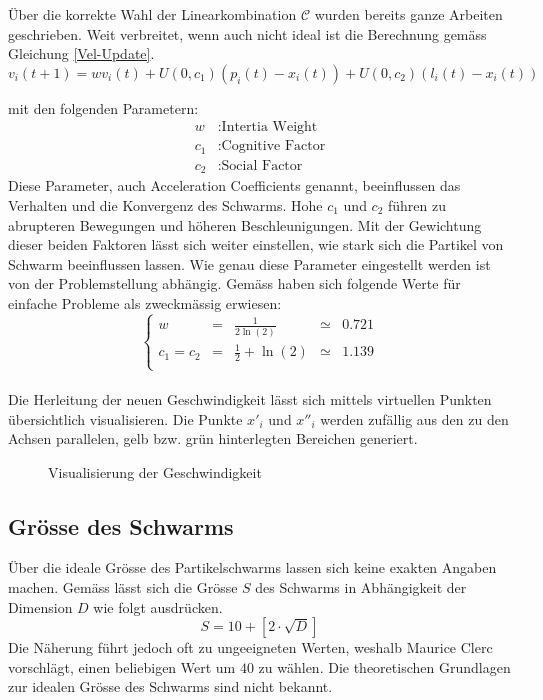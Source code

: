 Über die korrekte Wahl der Linearkombination $\mathcal{C}$ wurden bereits ganze Arbeiten geschrieben. Weit verbreitet, wenn auch nicht ideal ist die Berechnung gemäss Gleichung \ref{Vel-Update}. \\
\begin{equation}
	v_i(t+1) = w v_i(t) + U(0,c_1) (p_i(t)-x_i(t)) + U(0,c_2) (l_i(t)-x_i(t))\label{Vel-Update}
\end{equation}

mit den folgenden Parametern:
\begin{align*}
	w &: \text{Intertia Weight} \\
	c_1 &: \text{Cognitive Factor} \\
	c_2 &: \text{Social Factor}
\end{align*}
Diese Parameter, auch Acceleration Coefficients genannt, beeinflussen das  Verhalten und die Konvergenz des Schwarms. Hohe $c_1$ und $c_2$ führen zu abrupteren Bewegungen und höheren Beschleunigungen. Mit der Gewichtung dieser beiden Faktoren lässt sich weiter einstellen, wie stark sich die Partikel von Schwarm beeinflussen lassen. Wie genau diese Parameter eingestellt werden ist von der Problemstellung abhängig. Gemäss \cite{Clerc-Stagnation} haben sich folgende Werte für einfache Probleme als zweckmässig erwiesen:
\begin{equation}
	\left\lbrace \begin{array}{lllll}
		w & = & \frac{1}{2 \ln(2)} & \simeq & 0.721 \\
		c_1 = c_2 & = & \frac{1}{2} + \ln(2) & \simeq & 1.139 \\
	\end{array}	\right. 
\end{equation} \\


Die Herleitung der neuen Geschwindigkeit lässt sich mittels virtuellen Punkten übersichtlich visualisieren. Die Punkte $x'_i$ und $x''_i$ werden zufällig aus den zu den Achsen parallelen, gelb bzw. grün hinterlegten Bereichen generiert.  \\
\begin{figure}[htbp]
	\centering
	
	\caption{Visualisierung der Geschwindigkeit}
	\label{Fig-Visualisierung-Geschwindigkeit}
\end{figure}


\subsection{Grösse des Schwarms}
Über die ideale Grösse des Partikelschwarms lassen sich keine exakten Angaben machen. Gemäss \cite{Clerc-Standards} lässt sich die Grösse $S$ des Schwarms in Abhängigkeit der Dimension $D$ wie folgt ausdrücken.
\begin{equation}
	S = 10 + \left[ 2 \cdot \sqrt{D} \right]
\end{equation}
Die Näherung führt jedoch oft zu ungeeigneten Werten, weshalb Maurice Clerc vorschlägt, einen beliebigen Wert um $40$ zu wählen. Die theoretischen Grundlagen zur idealen Grösse des Schwarms sind nicht bekannt.


